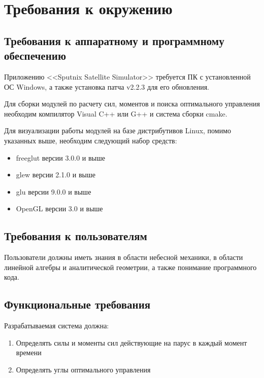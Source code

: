 \chapter{Требования к окружению}
\section{Требования к аппаратному и программному обеспечению}
\noindent\indent Приложению <<Sputnix Satellite Simulator>> требуется ПК с установленной
ОС Windows, а также установка патча v2.2.3 для его обновления.\par
Для сборки модулей по расчету сил, моментов и поиска оптимального
управления необходим компилятор Visual C++ или G++ и система сборки cmake.\par
Для визуализации работы модулей на базе дистрибутивов Linux, помимо
указанных выше, необходим следующий набор средств:
\begin{itemize}
  \item freeglut версии 3.0.0 и выше
  \item glew версии 2.1.0 и выше
  \item glu версии 9.0.0 и выше
  \item OpenGL версии 3.0 и выше
\end{itemize}
\section{Требования к пользователям}
\noindent\indent Пользователи должны иметь знания в области небесной механики,
в области линейной алгебры и аналитической геометрии, а также понимание программного
кода.
\section{Функциональные требования}
\noindent\indent Разрабатываемая система должна:
\begin{enumerate}
  \item Определять силы и моменты сил действующие на парус в каждый момент времени
  \item Определять углы оптимального управления
\end{enumerate}
